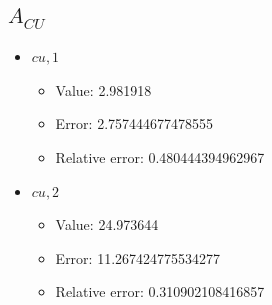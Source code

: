 \documentclass{article}%
\begin{document}
\subsection{$A_{CU}$}%
\begin{itemize}%
	\item $\textit{cu},1$%
	\begin{itemize}%
		\item Value: 2.981918%
		\item Error: 2.757444677478555%
		\item Relative error: 0.480444394962967%
	\end{itemize}%
	\item $\textit{cu},2$%
	\begin{itemize}%
		\item Value: 24.973644%
		\item Error: 11.267424775534277%
		\item Relative error: 0.310902108416857%
	\end{itemize}%
\end{itemize}%
\end{document}
